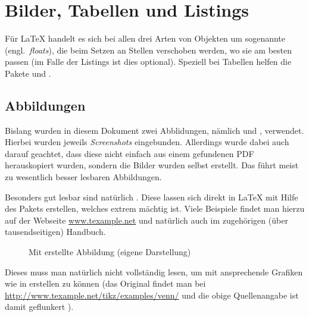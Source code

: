 \section{Bilder, Tabellen und Listings}
\label{sec:BilderTabellenListings}
%
Für \LaTeX{} handelt es sich bei allen drei Arten von Objekten um sogenannte 
(engl.~\emph{floats}), die beim Setzen an Stellen verschoben werden, wo sie am besten passen (im Falle
der Listings ist dies optional). 
Speziell bei Tabellen helfen die Pakete  und .
%
\subsection{Abbildungen}
\label{subsec:Abbildungen}
%
Bislang wurden in diesem Dokument zwei Abblidungen, nämlich  und 
, verwendet. Hierbei wurden jeweils \emph{Screenshots} eingebunden. Allerdings
wurde dabei auch darauf geachtet, dass diese nicht einfach aus einem gefundenen PDF herauskopiert wurden, sondern
die Bilder wurden selbst erstellt. Das führt meist zu wesentlich besser lesbaren Abbildungen.

Besonders gut lesbar sind natürlich . Diese lassen sich direkt in \LaTeX{} mit 
Hilfe des Pakets  erstellen, welches extrem mächtig ist. Viele Beispiele findet man hierzu auf
der Webseite \url{www.texample.net} und natürlich auch im zugehörigen (über tausendseitigen) Handbuch. 

\begin{figure}[H]
\begin{center}
\end{center}
\caption{Mit  erstellte Abbildung (eigene Darstellung)}
\label{fig:tikz}
\end{figure}
%
Dieses muss man natürlich nicht vollständig lesen, um mit  ansprechende Grafiken wie in 
 erstellen zu können (das Original findet man bei \url{http://www.texample.net/tikz/examples/venn/}
und die obige \glqq Quellenangabe\grqq{} ist damit geflunkert \frownie).

